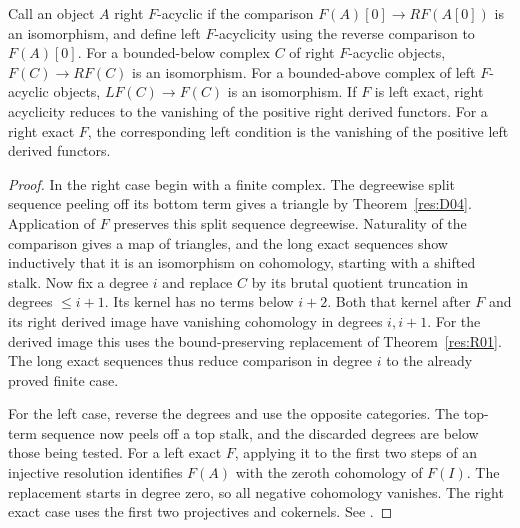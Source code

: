 \begin{theorem}\label{res:R08}
Call an object \(A\) right \(F\)-acyclic if the comparison
\(F(A)[0]\to RF(A[0])\) is an isomorphism, and define left
\(F\)-acyclicity using the reverse comparison to \(F(A)[0]\).
For a bounded-below complex \(C\) of right \(F\)-acyclic objects,
\(F(C)\to RF(C)\) is an isomorphism. For a bounded-above complex of left
\(F\)-acyclic objects, \(LF(C)\to F(C)\) is an isomorphism.
If \(F\) is left exact, right acyclicity reduces to the vanishing of the
positive right derived functors. For a right exact \(F\), the corresponding
left condition is the vanishing of the positive left derived functors.
\end{theorem}
\begin{proof}
In the right case begin with a finite complex. The degreewise split
sequence peeling off its bottom term gives a triangle by
Theorem~\ref{res:D04}. Application of \(F\) preserves this split sequence
degreewise. Naturality of the comparison gives a map of triangles,
and the long exact sequences show inductively that it is an isomorphism
on cohomology, starting with a shifted stalk.
Now fix a degree \(i\) and replace \(C\) by its brutal quotient truncation
in degrees \(\le i+1\). Its kernel has no terms below \(i+2\).
Both that kernel after \(F\) and its right derived image have
vanishing cohomology in degrees \(i,i+1\). For the derived image this
uses the bound-preserving replacement of Theorem~\ref{res:R01}.
The long exact sequences thus reduce comparison in degree \(i\)
to the already proved finite case.

For the left case, reverse the degrees and use the opposite categories.
The top-term sequence now peels off a top stalk, and the discarded
degrees are below those being tested. For a left exact \(F\), applying it
to the first two steps of an injective resolution identifies \(F(A)\)
with the zeroth cohomology of \(F(I)\). The replacement starts in degree
zero, so all negative cohomology vanishes. The right exact case uses the
first two projectives and cokernels. See
\cite[Tags 015E, 05TA]{stacks-derived}.
\end{proof}

